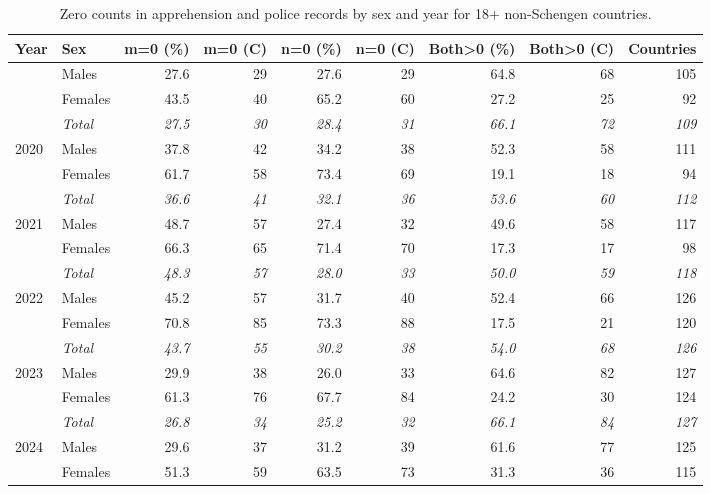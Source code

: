 \begin{table}[ht!]
\caption{\label{tbl-zero-counts}Zero counts in apprehension and police records by sex and year for 18+ non-Schengen countries.} 
\fontsize{9.0pt}{11.0pt}\selectfont
\begin{tabular*}{\linewidth}{@{\extracolsep{\fill}}llrrrrrrr}
\toprule
Year & Sex & m=0 (\%) & m=0 (C) & n=0 (\%) & n=0 (C) & Both>0 (\%) & Both>0 (C) & Countries \\ 
\midrule\addlinespace[2.5pt]
2019 & Males & 27.6 & 29 & 27.6 & 29 & 64.8 & 68 & 105 \\ 
 & Females & 43.5 & 40 & 65.2 & 60 & 27.2 & 25 & 92 \\ 
{\itshape } & {\itshape Total} & {\itshape 27.5} & {\itshape 30} & {\itshape 28.4} & {\itshape 31} & {\itshape 66.1} & {\itshape 72} & {\itshape 109} \\ 
2020 & Males & 37.8 & 42 & 34.2 & 38 & 52.3 & 58 & 111 \\ 
 & Females & 61.7 & 58 & 73.4 & 69 & 19.1 & 18 & 94 \\ 
{\itshape } & {\itshape Total} & {\itshape 36.6} & {\itshape 41} & {\itshape 32.1} & {\itshape 36} & {\itshape 53.6} & {\itshape 60} & {\itshape 112} \\ 
2021 & Males & 48.7 & 57 & 27.4 & 32 & 49.6 & 58 & 117 \\ 
 & Females & 66.3 & 65 & 71.4 & 70 & 17.3 & 17 & 98 \\ 
{\itshape } & {\itshape Total} & {\itshape 48.3} & {\itshape 57} & {\itshape 28.0} & {\itshape 33} & {\itshape 50.0} & {\itshape 59} & {\itshape 118} \\ 
2022 & Males & 45.2 & 57 & 31.7 & 40 & 52.4 & 66 & 126 \\ 
 & Females & 70.8 & 85 & 73.3 & 88 & 17.5 & 21 & 120 \\ 
{\itshape } & {\itshape Total} & {\itshape 43.7} & {\itshape 55} & {\itshape 30.2} & {\itshape 38} & {\itshape 54.0} & {\itshape 68} & {\itshape 126} \\ 
2023 & Males & 29.9 & 38 & 26.0 & 33 & 64.6 & 82 & 127 \\ 
 & Females & 61.3 & 76 & 67.7 & 84 & 24.2 & 30 & 124 \\ 
{\itshape } & {\itshape Total} & {\itshape 26.8} & {\itshape 34} & {\itshape 25.2} & {\itshape 32} & {\itshape 66.1} & {\itshape 84} & {\itshape 127} \\ 
2024 & Males & 29.6 & 37 & 31.2 & 39 & 61.6 & 77 & 125 \\ 
 & Females & 51.3 & 59 & 63.5 & 73 & 31.3 & 36 & 115 \\ 

\end{tabular*}
\end{table}
